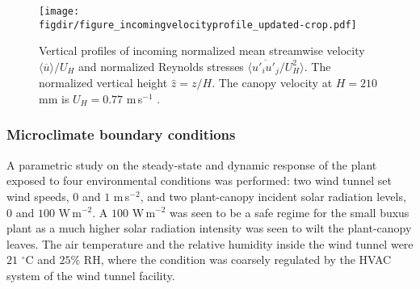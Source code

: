 	
\begin{figure}[t]
	\centering
	\texttt{[image: \\figdir/figure\_incomingvelocityprofile\_updated-crop.pdf]}
	\caption{Vertical profiles of incoming  normalized mean streamwise velocity $\langle \overline{u} \rangle / U_H$ and  normalized Reynolds stresses $\langle \overline{u'_i u'_j}/U_H^2 \rangle$. The normalized vertical height  $\hat{z}=z/H$. The canopy velocity at $H=210$ mm is $U_H = 0.77$ m\,s$^{-1}$ \citep{Tsalicoglou2018}.}
	\label{fig:incomingvelocityprofile}
\end{figure}

\subsubsection*{Microclimate boundary conditions}
A parametric study on the steady-state and dynamic response of the plant exposed to four environmental conditions was performed: two wind tunnel set wind speeds, $0$ and $1$ m\,s$^{-2}$, and two plant-canopy incident solar radiation levels, $0$ and $100$ W\,m$^{-2}$. A $100$ W\,m$^{-2}$ was seen to be a safe regime for the small buxus plant as a much higher solar radiation intensity was seen to wilt the plant-canopy leaves. The air temperature and the relative humidity inside the wind tunnel were $21$ $^{\circ}$C and $25$\% RH, where the condition was coarsely regulated by the HVAC system of the wind tunnel facility. 

